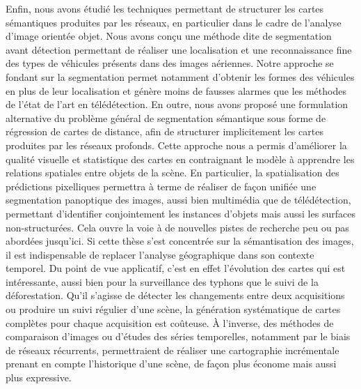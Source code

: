 Enfin, nous avons étudié les techniques permettant de structurer les cartes sémantiques produites par les réseaux, en particulier dans le cadre de l'analyse d'image orientée objet. Nous avons conçu une méthode dite de segmentation avant détection permettant de réaliser une localisation et une reconnaissance fine des types de véhicules présents dans des images aériennes. Notre approche se fondant sur la segmentation permet notamment d'obtenir les formes des véhicules en plus de leur localisation et génère moins de fausses alarmes que les méthodes de l'état de l'art en télédétection. En outre, nous avons proposé une formulation alternative du problème général de segmentation sémantique sous forme de régression de cartes de distance, afin de structurer implicitement les cartes produites par les réseaux profonds. Cette approche nous a permis d'améliorer la qualité visuelle et statistique des cartes en contraignant le modèle à apprendre les relations spatiales entre objets de la scène. En particulier, la spatialisation des prédictions pixelliques permettra à terme de réaliser de façon unifiée une segmentation panoptique des images, aussi bien multimédia que de télédétection, permettant d'identifier conjointement les instances d'objets mais aussi les surfaces non-structurées.
\medskip
Cela ouvre la voie à de nouvelles pistes de recherche peu ou pas abordées jusqu'ici. Si cette thèse s'est concentrée sur la sémantisation des images, il est indispensable de replacer l'analyse géographique dans son contexte temporel. Du point de vue applicatif, c'est en effet l'évolution des cartes qui est intéressante, aussi bien pour la surveillance des typhons que le suivi de la déforestation. Qu'il s'agisse de détecter les changements entre deux acquisitions ou produire un suivi régulier d'une scène, la génération systématique de cartes complètes pour chaque acquisition est coûteuse. À l'inverse, des méthodes de comparaison d'images ou d'études des séries temporelles, notamment par le biais de réseaux récurrents, permettraient de réaliser une cartographie incrémentale prenant en compte l'historique d'une scène, de façon plus économe mais aussi plus expressive.

